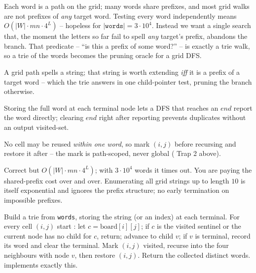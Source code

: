 Each word is a path on the grid; many words share prefixes, and most grid walks are not prefixes of
\emph{any} target word. Testing every word independently means $O(|W|\cdot mn\cdot 4^{L})$ -- hopeless for
$|\texttt{words}|=3\cdot 10^{4}$. Instead we want a single search that, the moment the letters so far fail
to spell \emph{any} target's prefix, abandons the branch. That predicate -- ``is this a prefix of some
word?'' -- is exactly a trie walk, so a trie of the words becomes the pruning oracle for a grid DFS.

\begin{observation}
A grid path spells a string; that string is worth extending \emph{iff} it is a prefix of a target word --
which the trie answers in one child-pointer test, pruning the branch otherwise.
\end{observation}
\begin{observation}
Storing the full word at each terminal node lets a DFS that reaches an $\mathit{end}$ report the word
directly; clearing $\mathit{end}$ right after reporting prevents duplicates without an output visited-set.
\end{observation}
\begin{observation}
No cell may be reused \emph{within one word}, so mark $(i,j)$ before recursing and restore it after --
the mark is path-scoped, never global ( Trap 2 above).
\end{observation}

\begin{thinkbox}
{Correct but $O(|W|\cdot mn\cdot 4^{L})$; with $3\cdot 10^{4}$ words it times out. You are paying the
shared-prefix cost over and over.}
{Enumerating all grid strings up to length $10$ is itself exponential and ignores the prefix structure;
no early termination on impossible prefixes.}
\end{thinkbox}

Build a trie from \texttt{words}, storing the string (or an index) at each terminal. For every cell
$(i,j)$ start : let $c=\text{board}[i][j]$; if $c$ is the visited sentinel or the
current node has no child for $c$, return; advance to child $v$; if $v$ is terminal, record its word and
clear the terminal. Mark $(i,j)$ visited, recurse into the four neighbours with node $v$, then restore
$(i,j)$. Return the collected distinct words.  implements exactly this.

